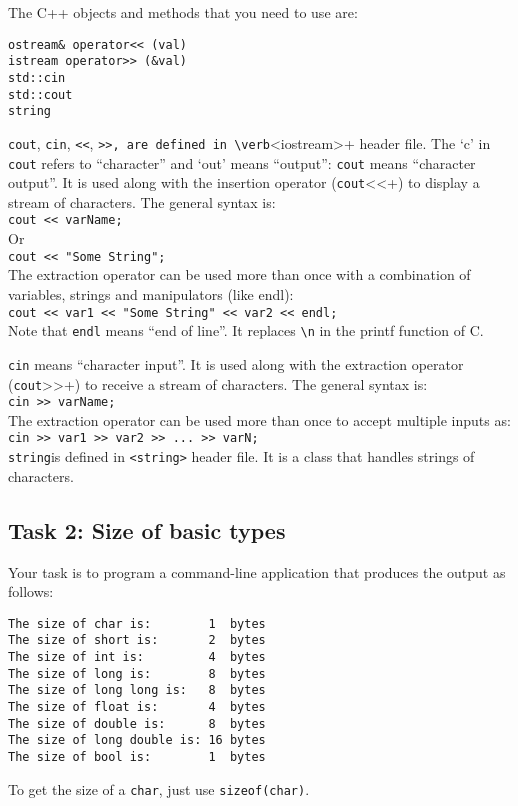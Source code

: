 The C++ objects and methods that you need to use are:
\begin{verbatim}
ostream& operator<< (val)
istream operator>> (&val)
std::cin
std::cout
string
\end{verbatim}

\verb+cout+, \verb+cin+, \verb+<<+, \verb+>>, are defined in \verb+<iostream>+ header file. 
The `c' in \verb+cout+ refers to ``character'' and `out' means ``output'': \verb+cout+ means ``character output''. 
It is used along with the insertion operator (\verb+cout+<<+) to display a stream of characters. 
The general syntax is:\\

\verb+cout << varName;+\\

Or\\

\verb+cout << "Some String";+\\

The extraction operator can be used more than once with a combination of variables, strings and manipulators (like endl):\\

\verb+cout << var1 << "Some String" << var2 << endl;+\\

Note that \verb+endl+ means ``end of line''. It replaces \verb+\n+ in the printf function of C.

\verb+cin+ means ``character input''. It is used along with the extraction operator (\verb+cout+>>+) to receive a stream of characters. 
The general syntax is:\\

\verb+cin >> varName;+\\

The extraction operator can be used more than once to accept multiple inputs as:\\

\verb+cin >> var1 >> var2 >> ... >> varN;+\\

\verb+string+is defined in \verb+<string>+ header file. It is a class that handles strings of characters.


\subsection*{Task 2: Size of basic types}

Your task is to program a command-line application that produces the output as follows:
\begin{verbatim}
The size of char is:        1  bytes
The size of short is:       2  bytes
The size of int is:         4  bytes
The size of long is:        8  bytes
The size of long long is:   8  bytes
The size of float is:       4  bytes
The size of double is:      8  bytes
The size of long double is: 16 bytes
The size of bool is:        1  bytes  
\end{verbatim}
To get the size of a \verb+char+, just use \verb+sizeof(char)+.



